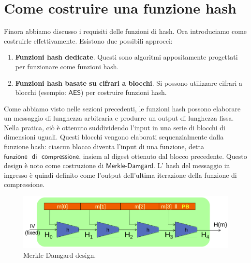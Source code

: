 \documentclass{article}
\begin{document}
\section{Come costruire una funzione hash}
\par \noindent Finora abbiamo discusso i requisiti delle funzioni di hash. Ora introduciamo come costruirle effettivamente. 
Esistono due possibili approcci:

\begin{enumerate}
    \item \textbf{Funzioni hash dedicate}. Questi sono algoritmi appositamente progettati per funzionare come funzioni hash.
    \item \textbf{Funzioni hash basate su cifrari a blocchi}. Si possono utilizzare cifrari a blocchi (esempio: $\mathsf{AES}$) per costruire funzioni hash.
\end{enumerate}

\noindent Come abbiamo visto nelle sezioni precedenti, le funzioni hash possono elaborare un messaggio di lunghezza 
arbitraria e produrre un output di lunghezza fissa. Nella pratica, ciò è ottenuto suddividendo l'input in una serie 
di blocchi di dimensioni uguali. Questi blocchi vengono elaborati sequenzialmente dalla funzione hash: ciascun blocco 
diventa l'input di una funzione, detta $\mathsf{funzione \text{ } di \text{ } compressione}$, insiem al digest ottenuto 
dal blocco precedente. Questo design è noto come costruzione di $\mathsf{Merkle\text{-}Damgard}$. L' hash del messaggio 
in ingresso è quindi definito come l'output dell'ultima iterazione della funzione di compressione.

\begin{figure}
    \centering
    \includegraphics[width=0.65\linewidth]{figures/merkle-damgard.png}
    \caption{\label{fig:merkle_damgard}Merkle-Damgard design.}
\end{figure}
\end{document}
